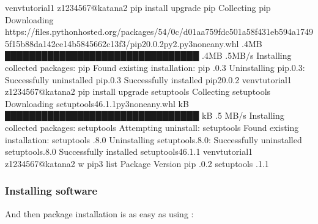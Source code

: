 \documentclass[letterpaper,10pt,english]{sphinxmanual}
\begin{document}
\begin{sphinxVerbatim}[commandchars=\\\{\}]
venv\PYGZhy{}tutorial\PYGZhy{}1 \PYG{o}{[}z1234567@katana2 \PYGZti{}\PYG{o}{]}\PYGZdl{} pip install \PYGZhy{}\PYGZhy{}upgrade pip
Collecting pip
  Downloading https://files.pythonhosted.org/packages/54/0c/d01aa759fdc501a58f431eb594a17495f15b88da142ce14b5845662c13f3/pip\PYGZhy{}20.0.2\PYGZhy{}py2.py3\PYGZhy{}none\PYGZhy{}any.whl .4MB
    \PYGZpc{} ████████████████████████████████ .4MB .5MB/s
Installing collected packages: pip
  Found existing installation: pip .0.3
    Uninstalling pip.0.3:
    Successfully uninstalled pip.0.3
Successfully installed pip\PYGZhy{}20.0.2
venv\PYGZhy{}tutorial\PYGZhy{}1 \PYG{o}{[}z1234567@katana2 \PYGZti{}\PYG{o}{]}\PYGZdl{} pip install \PYGZhy{}\PYGZhy{}upgrade setuptools
Collecting setuptools
  Downloading setuptools\PYGZhy{}46.1.1\PYGZhy{}py3\PYGZhy{}none\PYGZhy{}any.whl  kB
     ████████████████████████████████  kB .5 MB/s
Installing collected packages: setuptools
  Attempting uninstall: setuptools
    Found existing installation: setuptools .8.0
            Uninstalling setuptools.8.0:
          Successfully uninstalled setuptools.8.0
Successfully installed setuptools\PYGZhy{}46.1.1
venv\PYGZhy{}tutorial\PYGZhy{}1 \PYG{o}{[}z1234567@katana2 w\PYGZti{}\PYG{o}{]}\PYGZdl{} pip3 list
Package    Version
\PYGZhy{}\PYGZhy{}\PYGZhy{}\PYGZhy{}\PYGZhy{}\PYGZhy{}\PYGZhy{}\PYGZhy{}\PYGZhy{}\PYGZhy{} \PYGZhy{}\PYGZhy{}\PYGZhy{}\PYGZhy{}\PYGZhy{}\PYGZhy{}\PYGZhy{}
pip        .0.2
setuptools .1.1
\end{sphinxVerbatim}


\subsubsection{Installing software}
\label{\detokenize{software/python-virtualenvs:installing-software}}
And then package installation is as easy as using :
\end{document}
